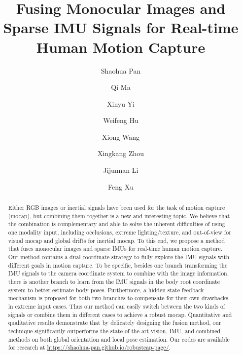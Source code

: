 \documentclass[sigconf,nonacm=true]{acmart}
\begin{document}
\title{Fusing Monocular Images and Sparse IMU Signals for Real-time Human Motion Capture}

\author{Shaohua Pan}

\author{Qi Ma}

\author{Xinyu Yi}

\author{Weifeng Hu}

\author{Xiong Wang}

\author{Xingkang Zhou}

\author{Jijunnan Li}

\author{Feng Xu}

\begin{abstract}
    Either RGB images or inertial signals have been used for the task of motion capture (mocap), but combining them together is a new and interesting topic.
We believe that the combination is complementary and able to solve the inherent difficulties of using one modality input, including occlusions, extreme lighting/texture, and out-of-view for visual mocap and global drifts for inertial mocap.
To this end, we propose a method that fuses monocular images and sparse IMUs for real-time human motion capture.
Our method contains a dual coordinate strategy to fully explore the IMU signals with different goals in motion capture.
To be specific, besides one branch transforming the IMU signals to the camera coordinate system to combine with the image information, there is another branch to learn from the IMU signals in the body root coordinate system to better estimate body poses.
Furthermore, a hidden state feedback mechanism is proposed for both two branches to compensate for their own drawbacks in extreme input cases. 
Thus our method can easily switch between the two kinds of signals or combine them in different cases to achieve a robust mocap.
Quantitative and qualitative results demonstrate that by delicately designing the fusion method, our technique significantly outperforms the state-of-the-art vision, IMU, and combined methods on both global orientation and local pose estimation.
Our codes are available for research at \url{https://shaohua-pan.github.io/robustcap-page/}. \end{abstract}
\end{document}
